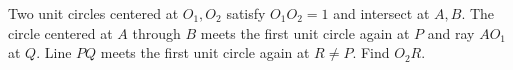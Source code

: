 Two unit circles centered at $ O_1,O_2 $ satisfy $ O_1O_2=1 $ and intersect at $ A,B $. The circle centered at $ A $ through $ B $ meets the first unit circle again at $ P $ and ray $ AO_1 $ at $ Q $. Line $ PQ $ meets the first unit circle again at $ R\ne P $. Find $ O_2R $.
